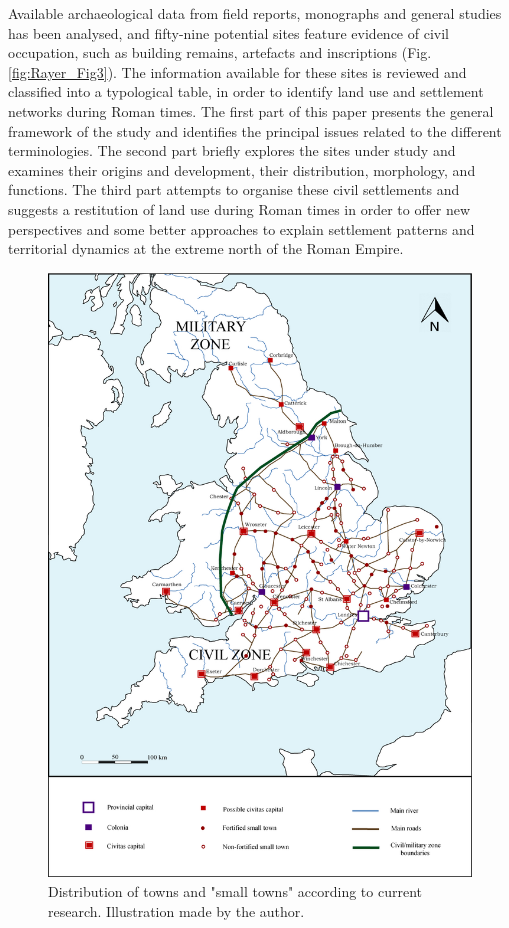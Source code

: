 	Available archaeological data from field reports, monographs and general studies has been analysed, and fifty-nine potential sites feature evidence of civil occupation, such as building remains, artefacts and inscriptions (Fig. \ref{fig:Rayer_Fig3}). The information available for these sites is reviewed and classified into a typological table, in order to identify land use and settlement networks during Roman times. 
The first part of this paper presents the general framework of the study and identifies the principal issues related to the different terminologies. The second part briefly explores the sites under study and examines their origins and development, their distribution, morphology, and functions. The third part attempts to organise these civil settlements and suggests a restitution of land use during Roman times in order to offer new perspectives and some better approaches to explain settlement patterns and territorial dynamics at the extreme north of the Roman Empire.
	
	\begin{figure}
		\includegraphics[width=\linewidth]{figures/rayer_Fig1.jpg}
		\caption{Distribution of towns and "small towns" according to current research. Illustration made by the author.}
		\label{fig:Rayer_Fig1}
	\end{figure}

